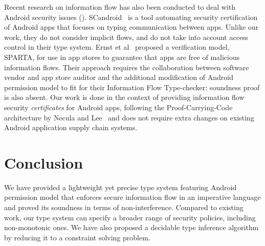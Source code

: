 {{{Recent research on information flow has also been conducted to deal
with Android security issues
(\cite{Ernst:2014,Chin:2011wa,Nadkarni:2016tf,Lortz:2014ku,Gunadi:2015,Chaudhuri:2009ii,Fuchs2010}).
SCandroid~\cite{Chaudhuri:2009ii,Fuchs2010} is a tool automating
security certification of Android apps that focuses on typing
communication between apps. Unlike our work, they do not
consider implicit flows, and do not take into account access control
in their type system. Ernst et al~\cite{Ernst:2014} proposed a
verification model, SPARTA, for use in app stores to guarantee that
apps are free of malicious information flows. Their approach requires
the collaboration between software vendor and app store auditor and
the additional modification of Android permission model to fit for
their Information Flow Type-checker;
soundness proof is also absent. Our work is done in the context of
providing information flow security \emph{certificates} for Android
apps, following the Proof-Carrying-Code  architecture by
Necula and Lee~\cite{necula:pcc:1996} and does not require extra
changes on existing Android application supply chain systems.


\section{Conclusion}\label{sec:conclusion}

We have provided a lightweight yet precise type system featuring Android permission model that enforces secure information flow in an
imperative language and proved its soundness in terms of non-interference.
Compared to existing work, our type system can specify a broader range of security policies, including non-monotonic ones.
We have also proposed a decidable type inference algorithm by reducing it to a constraint solving problem.

}}}
